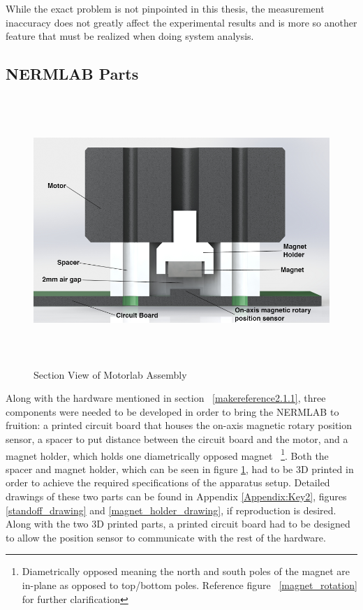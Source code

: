 While the exact problem is not pinpointed in this thesis, the measurement inaccuracy does not greatly affect the experimental results and is more so another feature that must be realized when doing system analysis.

\subsection{NERMLAB Parts}
\label{makereference2.1.2} 

\begin{figure}[H]%
	
	\includegraphics[height=4in]{figures/section_view_motorlab_assembly.png}
	
	\caption[Section View of Motorlab Assembly]{Section View of Motorlab Assembly}
	
	\label{section_view_motorlab}
\end{figure}

Along with the hardware mentioned in section ~\ref{makereference2.1.1}, three components were needed to be developed in order to bring the NERMLAB to fruition: a printed circuit board that houses the on-axis magnetic rotary position sensor, a spacer to put distance between the circuit board and the motor, and a magnet holder, which holds one diametrically opposed magnet ~\footnote{Diametrically opposed meaning the north and south poles of the magnet are in-plane as opposed to top/bottom poles. Reference figure ~\ref{magnet_rotation} for further clarification}. Both the spacer and magnet holder, which can be seen in figure \ref{section_view_motorlab}, had to be 3D printed in order to achieve the required specifications of the apparatus setup. Detailed drawings of these two parts can be found in Appendix \ref{Appendix:Key2}, figures \ref{standoff_drawing} and \ref{magnet_holder_drawing}, if reproduction is desired. Along with the two 3D printed parts, a printed circuit board had to be designed to allow the position sensor to communicate with the rest of the hardware.

